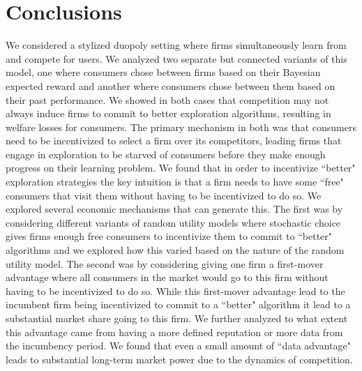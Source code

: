 \documentclass[../competing_bandits.tex]{subfiles}
\begin{document}
\section{Conclusions}\label{sec:conclusion}

We considered a stylized duopoly setting where firms simultaneously learn from and compete for users. We analyzed two separate but connected variants of this model, one where consumers chose between firms based on their Bayesian expected reward and another where consumers chose between them based on their past performance. We showed in both cases that competition may not always induce firms to commit to better exploration algorithms, resulting in welfare losses for consumers. The primary mechanism in both was that consumers need to be incentivized to select a firm over its competitors, leading firms that engage in exploration to be starved of consumers before they make enough progress on their learning problem. We found that in order to incentivize ``better" exploration strategies the key intuition is that a firm needs to have some ``free" consumers that visit them without having to be incentivized to do so. We explored several economic mechanisms that can generate this. The first was by considering different variants of random utility models where stochastic choice gives firms enough free consumers to incentivize them to commit to ``better" algorithms and we explored how this varied based on the nature of the random utility model. The second was by considering giving one firm a first-mover advantage where all consumers in the market would go to this firm without having to be incentivized to do so. While this first-mover advantage lead to the incumbent firm being incentivized to commit to a ``better" algorithm it lead to a substantial market share going to this firm. We further analyzed to what extent this advantage came from having a more defined reputation or more data from the incumbency period. We found that even a small amount of ``data advantage" leads to substantial long-term market power due to the dynamics of competition.
\end{document}
